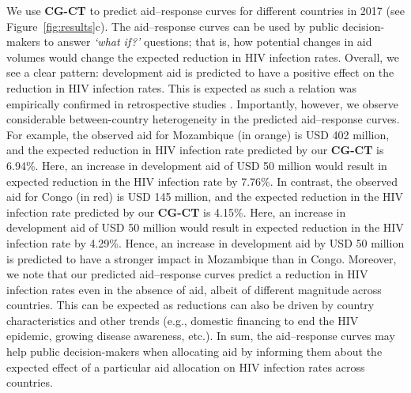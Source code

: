 \documentclass[sigconf]{acmart}
\newcommand{\framework}{\textbf{\mbox{CG-CT}}\xspace}
\begin{document}
We use \framework to predict aid--response curves for different countries in 2017 (see Figure~\ref{fig:results}c). The aid--response curves can be used by public decision-makers to answer \emph{`what if?'} questions; that is, how potential changes in aid volumes would change the expected reduction in HIV infection rates. Overall, we see a clear pattern: development aid is predicted to have a positive effect on the reduction in HIV infection rates. This is expected as such a relation was empirically confirmed in retrospective studies \cite{Munyanyi2020}. Importantly, however, we observe considerable between-country heterogeneity in the predicted aid--response curves. For example, the observed aid for Mozambique (in orange) is USD 402 million, and the expected reduction in HIV infection rate predicted by our \framework is 6.94\%. Here, an increase in development aid of USD 50 million would result in expected reduction in the HIV infection rate by 7.76\%. In contrast, the observed aid for Congo (in red) is USD 145 million, and the expected reduction in the HIV infection rate predicted by our \framework is 4.15\%. Here, an increase in development aid of USD 50 million would result in expected reduction in the HIV infection rate by 4.29\%. Hence, an increase in development aid by USD 50 million is predicted to have a stronger impact in Mozambique than in Congo. Moreover, we note that our predicted aid--response curves predict a reduction in HIV infection rates even in the absence of aid, albeit of different magnitude across countries. This can be expected as reductions can also be driven by country characteristics and other trends (e.g., domestic financing to end the HIV epidemic, growing disease awareness, etc.). In sum, the aid--response curves may help public decision-makers when allocating aid by informing them about the expected effect of a particular aid allocation on HIV infection rates across countries. 
\end{document}
